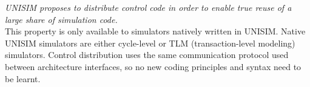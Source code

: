 \begin{itemize}
\emph{UNISIM proposes to distribute control code in order to enable true reuse of a large share of simulation code.}\\
This property is only available to simulators natively written in UNISIM. Native UNISIM simulators are either cycle-level or TLM (transaction-level modeling) simulators. Control distribution uses the same communication protocol used between architecture interfaces, so no new coding principles and syntax need to be learnt.
\end{itemize}
